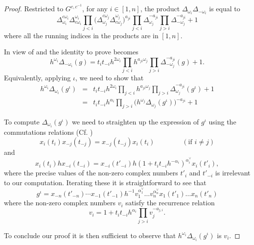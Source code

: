 \documentclass[12pt]{amsart}
\newcommand{\sayDR}[1]{\say[DR]{\color{red}{\bf DR:}\;#1}}
\theoremstyle{remark}
\numberwithin{equation}{section}
\begin{document}
\begin{proof}
  Restricted to $G^{c,c^{-1}}$, for any $i\in[1,n]$, the product $\Delta_{\omega_i}\Delta_{-\omega_i}$ is equal to
  \begin{equation} 
    \Delta^{c \omega_i}_{\omega_i}
    \Delta^{\omega_i}_{ c\omega_i} 
    \prod_{j<i}\big(
      \Delta^{c \omega_j}_{\omega_j} 
      \Delta^{\omega_j}_{c \omega_j}
    \big)^{a_{j i}}
    \prod_{j<i}\Delta_{\omega_j}^{-a_{ji}}
    \prod_{j>i}\Delta_{-\omega_j}^{-a_{ji}}
    +1
  \end{equation}
  where all the running indices in the products are in $[1,n]$.

  In view of  and \sayDR{Missing reference} the identity to prove becomes
  \[
    h^{\omega_i}\Delta_{-\omega_i}(g)
    =
    t_i
    t_{-i}
    h^{2\omega_i}
    \prod_{j<i}h^{a_{j i}\omega_j}
    \prod_{j>i}\Delta_{-\omega_j}^{-a_{ji}}(g)
    +
    1.
  \]
  Equivalently, applying $\iota$, we need to show that 
  \begin{eqnarray*}
    h^{\omega_i}\Delta_{\omega_i}(g^\iota)
    & = &
    t_i
    t_{-i}
    h^{2\omega_i}
    \prod_{j<i}h^{a_{ji}\omega_j}
    \prod_{j>i}\Delta_{\omega_j}^{-a_{ji}}(g^\iota)
    +
    1\\
    & = &
    t_i
    t_{-i}
    h^{\alpha_i}
    \prod_{j>i}\Big(h^{\omega_j}\Delta_{\omega_j}(g^\iota)\Big)^{-a_{ji}}
    +
    1
  \end{eqnarray*}

  To compute $\Delta_{\omega_i}(g^\iota)$ we need to straighten up the expression of $g^\iota$ using the commutations relations (Cf. \cite[Proposition 7.2]{BZ01})
  \begin{equation}
    x_i(t_i)x_{-j}(t_{-j}) 
    =
    x_{-j}(t_{-j})x_i(t_i) 
    \qquad
    \qquad
    (\text{if $i\neq j$})
  \end{equation}
  and
  \begin{equation}
    x_i(t_i) h x_{-i}(t_{-i})
    =
    x_{-i}(t'_{-i})
    h
    (1+t_it_{-i}h^{-\alpha_i})^{\alpha_i^\vee}
    x_{i}(t'_i),
  \end{equation}
  where the precise values of the non-zero complex numbers $t'_i$ and $t'_{-i}$ is irrelevant to our computation.
  Iterating these it is straightforward to see that
  \[
    g^\iota 
    = 
    x_{-n}(t'_{-n})
    \cdots
    x_{-1}(t'_{-1})
    h^{-1}
    v_1^{\alpha^\vee_1}
    \dots
    v_n^{\alpha^\vee_n}
    x_1(t'_1)
    \dots
    x_n(t'_n)
  \]
  where the non-zero complex numbers $v_i$ satisfy the recurrence relation
  \[
    v_i 
    = 
    1 + t_i t_{-i} h^{\alpha_i}
    \prod_{j > i} v_j^{-a_{j,i}}.
  \]

  To conclude our proof it is then sufficient to observe that $h^{\omega_i}\Delta_{\omega_i}(g^\iota)$ is $v_i$.
\end{proof}
\end{document}
